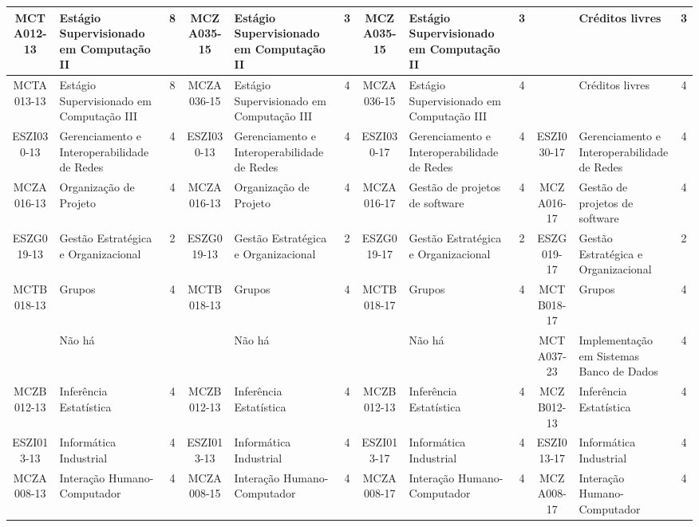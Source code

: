 \documentclass[a4paper]{article}
\begin{document}
\begin{landscape}
{\begin{longtable}{|c|p{.2\textheight}|c||c|p{.2\textheight}|c||c|p{.2\textheight}|c||c|p{.2\textheight}|c|}
MCTA012-13 & Estágio Supervisionado em Computação II& 8 &
MCZA035-15 & Estágio Supervisionado em Computação II & 3 &
MCZA035-15 & Estágio Supervisionado em Computação II & 3 &
& Créditos livres & 3 \\ \hline

MCTA013-13 & Estágio Supervisionado em Computação III& 8 &
MCZA036-15 & Estágio Supervisionado em Computação III & 4 &
MCZA036-15 & Estágio Supervisionado em Computação III & 4 &
& Créditos livres & 4\\ \hline

ESZI030-13 & Gerenciamento e Interoperabilidade de Redes & 4 &
ESZI030-13 & Gerenciamento e Interoperabilidade de Redes & 4 &
ESZI030-17 & Gerenciamento e Interoperabilidade de Redes & 4 & 
ESZI030-17 & Gerenciamento e Interoperabilidade de Redes & 4\\ \hline

MCZA016-13 & Organização de Projeto & 4 &
MCZA016-13 & Organização de Projeto & 4 &
MCZA016-17 & Gestão de projetos de software & 4 & 
MCZA016-17 & Gestão de projetos de software & 4\\ \hline

ESZG019-13 & Gestão Estratégica e Organizacional & 2 &
ESZG019-13 & Gestão Estratégica e Organizacional & 2 &
ESZG019-17 & Gestão Estratégica e Organizacional & 2 &
ESZG019-17 & Gestão Estratégica e Organizacional & 2\\ \hline

MCTB018-13 & Grupos & 4 &
MCTB018-13 & Grupos & 4 &
MCTB018-17 & Grupos & 4 &
MCTB018-17 & Grupos & 4\\ \hline

& Não há & &
& Não há & & 
& Não há & & 
MCTA037-23 & Implementação em Sistemas Banco de Dados & 4\\ \hline

MCZB012-13 & Inferência Estatística & 4 &
MCZB012-13 & Inferência Estatística & 4 &
MCZB012-13 & Inferência Estatística & 4 &
MCZB012-13 & Inferência Estatística & 4\\ \hline

ESZI013-13 & Informática Industrial & 4 &
ESZI013-13 & Informática Industrial & 4 &
ESZI013-17 & Informática Industrial & 4 & 
ESZI013-17 & Informática Industrial & 4\\ \hline

MCZA008-13 & Interação Humano-Computador & 4 &
MCZA008-15 & Interação Humano-Computador & 4 &
MCZA008-17 & Interação Humano-Computador & 4 &
MCZA008-17 & Interação Humano-Computador & 4\\ \hline


\end{longtable}}
\end{landscape}
\end{document}
